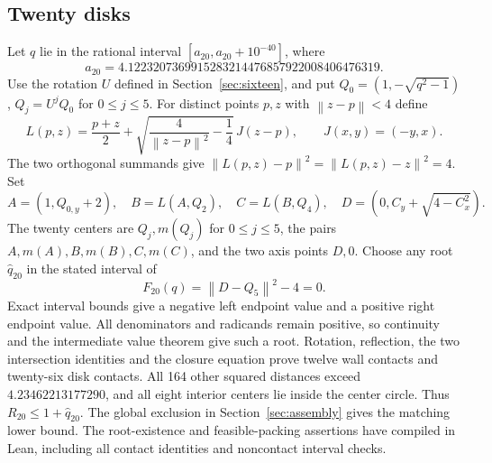 \documentclass[11pt]{amsart}
\theoremstyle{definition}
\theoremstyle{remark}
\newcommand{\norm}[1]{\left\lVert #1\right\rVert}
\begin{document}
\subsection{Twenty disks}\label{sec:twenty}
Let $q$ lie in the rational interval $[a_{20},a_{20}+10^{-40}]$, where
\[
 a_{20}=4.1223207369915283214476857922008406476319.
\]
Use the rotation $U$ defined in Section~\ref{sec:sixteen}, and put
$Q_0=(1,-\sqrt{q^2-1})$, $Q_j=U^jQ_0$ for $0\le j\le5$.
For distinct points $p,z$ with $\norm{z-p}<4$ define
\[
 L(p,z)=\frac{p+z}{2}
       +\sqrt{\frac4{\norm{z-p}^2}-\frac14}\,J(z-p),
 \qquad J(x,y)=(-y,x).
\]
The two orthogonal summands give
$\norm{L(p,z)-p}^2=\norm{L(p,z)-z}^2=4$. Set
\[
 A=(1,Q_{0,y}+2),\quad B=L(A,Q_2),\quad C=L(B,Q_4),
 \quad D=(0,C_y+\sqrt{4-C_x^2}).
\]
The twenty centers are $Q_j,m(Q_j)$ for $0\le j\le5$, the pairs
$A,m(A),B,m(B),C,m(C)$, and the two axis points $D,0$.
Choose any root $\widehat q_{20}$ in the stated interval of
\[
 F_{20}(q)=\norm{D-Q_5}^2-4=0.
\]
Exact interval bounds give a negative left endpoint value and a positive
right endpoint value. All denominators and radicands remain positive,
so continuity and the intermediate value theorem give such a root.
Rotation, reflection, the two intersection identities and the closure
equation prove twelve wall contacts and twenty-six disk contacts.
All 164 other squared distances exceed $4.23462213177290$, and all eight
interior centers lie inside the center circle. Thus
$R_{20}\le1+\widehat q_{20}$. The global exclusion in
Section~\ref{sec:assembly} gives the matching lower bound.
The root-existence and feasible-packing assertions have compiled in Lean,
including all contact identities and noncontact interval checks.
\end{document}
